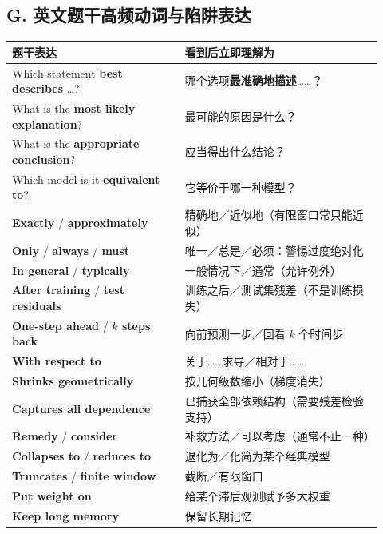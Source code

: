 \documentclass[UTF8,fontset=fandol,10.5pt,a4paper]{ctexart}
\begin{document}
\subsection*{G. 英文题干高频动词与陷阱表达}
\begin{longtable}{@{}p{0.43\linewidth}p{0.49\linewidth}@{}}
\toprule 题干表达 & 看到后立即理解为\\\midrule\endhead
Which statement \textbf{best describes} \ldots? & 哪个选项\textbf{最准确地描述}……？\\
What is the \textbf{most likely explanation}? & 最可能的原因是什么？\\
What is the \textbf{appropriate conclusion}? & 应当得出什么结论？\\
Which model is it \textbf{equivalent to}? & 它等价于哪一种模型？\\
\textbf{Exactly} / \textbf{approximately} & 精确地／近似地（有限窗口常只能近似）\\
\textbf{Only} / \textbf{always} / \textbf{must} & 唯一／总是／必须：警惕过度绝对化\\
\textbf{In general} / \textbf{typically} & 一般情况下／通常（允许例外）\\
\textbf{After training} / \textbf{test residuals} & 训练之后／测试集残差（不是训练损失）\\
\textbf{One-step ahead} / \textbf{$k$ steps back} & 向前预测一步／回看 $k$ 个时间步\\
\textbf{With respect to} & 关于……求导／相对于……\\
\textbf{Shrinks geometrically} & 按几何级数缩小（梯度消失）\\
\textbf{Captures all dependence} & 已捕获全部依赖结构（需要残差检验支持）\\
\textbf{Remedy} / \textbf{consider} & 补救方法／可以考虑（通常不止一种）\\
\textbf{Collapses to} / \textbf{reduces to} & 退化为／化简为某个经典模型\\
\textbf{Truncates} / \textbf{finite window} & 截断／有限窗口\\
\textbf{Put weight on} & 给某个滞后观测赋予多大权重\\
\textbf{Keep long memory} & 保留长期记忆\\
\bottomrule
\end{longtable}
\end{document}
